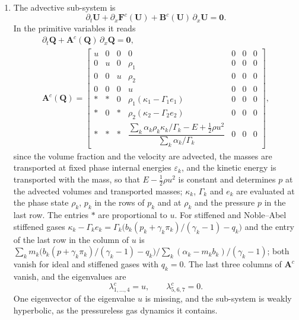 \documentclass[a4paper,fleqn]{cas-sc}
\begin{document}
\begin{enumerate}
\item The advective sub-system is
\begin{equation}
\partial_t\mathbf U+\partial_x\mathbf F^c(\mathbf U)+\mathbf B^c(\mathbf U)\,\partial_x\mathbf U=\mathbf 0 .
\label{eq:advective}
\end{equation}
In the primitive variables it reads
\begin{equation}
\begin{gathered}
\partial_t\mathbf Q+\mathbf A^c(\mathbf Q)\,\partial_x\mathbf Q=\mathbf 0,\\
\mathbf A^c(\mathbf Q)=\begin{bmatrix}
u&0&0&0&0&0&0\\
0&u&0&\rho_1&0&0&0\\
0&0&u&\rho_2&0&0&0\\
0&0&0&u&0&0&0\\
\ast&\ast&0&\rho_1(\kappa_1-\Gamma_1e_1)&0&0&0\\
\ast&0&\ast&\rho_2(\kappa_2-\Gamma_2e_2)&0&0&0\\
\ast&\ast&\ast&\dfrac{\sum_k\alpha_k\rho_k\kappa_k/\Gamma_k-E+\tfrac12\rho u^2}{\sum_k\alpha_k/\Gamma_k}&0&0&0
\end{bmatrix},
\end{gathered}
\label{eq:Ac}
\end{equation}
since the volume fraction and the velocity are advected, the masses are transported at fixed phase internal energies
$\varepsilon_k$, and the kinetic energy is transported with the mass, so that $E-\tfrac12\rho u^2$ is constant and determines $p$ at the
advected volumes and transported masses; $\kappa_k$, $\Gamma_k$ and $e_k$ are evaluated at the phase state $\rho_k$, $p_k$ in the rows of $p_k$
and at $\rho_k$ and the pressure $p$ in the last row. The entries $\ast$ are proportional to $u$. For stiffened and Noble--Abel stiffened gases $\kappa_k-\Gamma_ke_k=\Gamma_k\big(b_k(p_k+\gamma_k\pi_k)/(\gamma_k-1)-q_k\big)$ and
the entry of the last row in the column of $u$ is $\sum_km_k\big(b_k(p+\gamma_k\pi_k)/(\gamma_k-1)-q_k\big)\big/\sum_k(\alpha_k-m_kb_k)/(\gamma_k-1)$; both vanish for ideal and stiffened gases
with $q_k=0$. The last three columns of $\mathbf A^c$ vanish, and the eigenvalues are
\begin{equation}
\lambda^c_{1,\dots,4}=u,\qquad \lambda^c_{5,6,7}=0 .
\label{eq:eig_adv}
\end{equation}
One eigenvector of the eigenvalue $u$ is missing, and the sub-system is weakly hyperbolic, as the pressureless gas dynamics it contains.

\end{enumerate}
\end{document}
